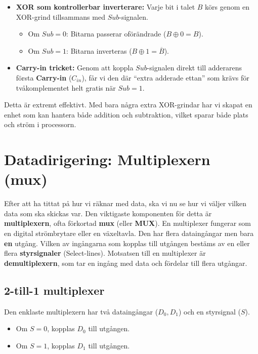 \documentclass[
  swedish,
  letterpaper,
  oneside,
  openany]{book}
\providecommand{\tightlist}{%
  \setlength{\itemsep}{0pt}\setlength{\parskip}{0pt}}
\begin{document}
\begin{itemize}
\tightlist
\item
  \textbf{XOR som kontrollerbar inverterare:} Varje bit i talet \(B\)
  körs genom en XOR-grind tillsammans med \(Sub\)-signalen.

  \begin{itemize}
  \tightlist
  \item
    Om \(Sub = 0\): Bitarna passerar oförändrade (\(B \oplus 0 = B\)).
  \item
    Om \(Sub = 1\): Bitarna inverteras (\(B \oplus 1 = \overline{B}\)).
  \end{itemize}
\item
  \textbf{Carry-in tricket:} Genom att koppla \(Sub\)-signalen direkt
  till adderarens första \textbf{Carry-in} (\(C_{in}\)), får vi den där
  ``extra adderade ettan'' som krävs för tvåkomplementet helt gratis när
  \(Sub=1\).
\end{itemize}

Detta är extremt effektivt. Med bara några extra XOR-grindar har vi
skapat en enhet som kan hantera både addition och subtraktion, vilket
sparar både plats och ström i processorn.

\section{Datadirigering: Multiplexern (mux)}\label{sec-multiplexern}

Efter att ha tittat på hur vi räknar med data, ska vi nu se hur vi
väljer vilken data som ska skickas var. Den viktigaste komponenten för
detta är \textbf{multiplexern}, ofta förkortad \textbf{mux} (eller
\textbf{MUX}). En multiplexer fungerar som en digital strömbrytare eller
en växeltavla. Den har flera dataingångar men bara \textbf{en} utgång.
Vilken av ingångarna som kopplas till utgången bestäms av en eller flera
\textbf{styrsignaler} (Select-lines). Motsatsen till en multiplexer är
\textbf{demultiplexern}, som tar en ingång med data och fördelar till
flera utgångar.

\subsection{2-till-1 multiplexer}\label{sec-2-till-1-multiplexer}

Den enklaste multiplexern har två dataingångar (\(D_0, D_1\)) och en
styrsignal (\(S\)).

\begin{itemize}
\tightlist
\item
  Om \(S = 0\), kopplas \(D_0\) till utgången.
\item
  Om \(S = 1\), kopplas \(D_1\) till utgången.
\end{itemize}
\end{document}
